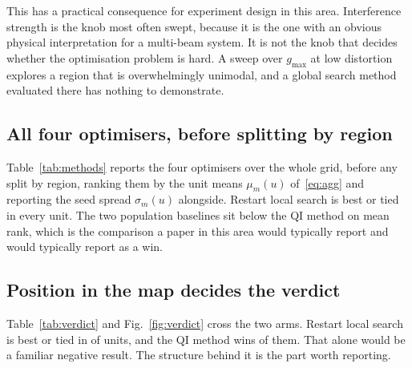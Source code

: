 \documentclass[runningheads]{llncs}
\begin{document}
This has a practical consequence for experiment design in this area. Interference strength is the
knob most often swept, because it is the one with an obvious physical interpretation for a
multi-beam system. It is not the knob that decides whether the optimisation problem is hard. A
sweep over $g_{\max}$ at low distortion explores a region that is overwhelmingly unimodal, and a
global search method evaluated there has nothing to demonstrate.

\subsection{All four optimisers, before splitting by region}

Table~\ref{tab:methods} reports the four optimisers over the whole grid, before any split by
region, ranking them by the unit means $\mu_m(u)$ of~\eqref{eq:agg} and reporting the seed spread
$\sigma_m(u)$ alongside. Restart local search is best or tied in every unit. The two population
baselines sit below the QI method on mean rank, which is the comparison a paper in this area
would typically report and would typically report as a win.

\begin{table}[t]
\centering
\caption{All four optimisers over all \numUnits{} units. Mean rank is averaged over units, lower
being better. The last column is the median standard deviation across the \numSeeds{} seeds.}
\label{tab:methods}

\end{table}

\subsection{Position in the map decides the verdict}

Table~\ref{tab:verdict} and Fig.~\ref{fig:verdict} cross the two arms. Restart
local search is best or tied in \numRestartBest{} of \numUnits{} units, and the QI method wins
\numQpsoWinTotal{} of them. That alone would be a familiar negative result. The structure behind
it is the part worth reporting.

\begin{table}[t]
\centering
\caption{QI method against restart local search, split by region of the instance space. The last
column is the absolute mean difference divided by the seed-induced standard deviation.}
\label{tab:verdict}

\end{table}
\end{document}
